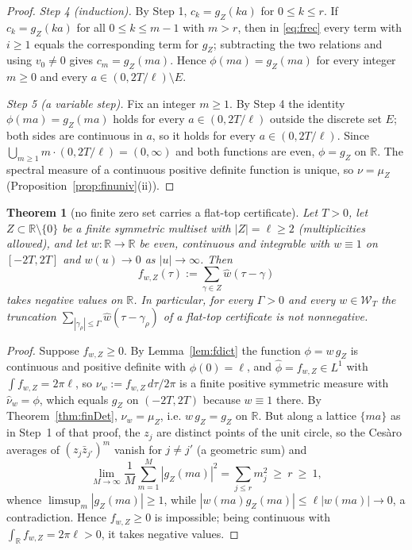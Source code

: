 \documentclass[11pt]{amsart}
\newtheorem{theorem}{Theorem}[section]
\theoremstyle{definition}
\theoremstyle{remark}
\newcommand{\R}{\mathbb R}
\newcommand{\nuh}{\widehat\nu}
\newcommand{\wh}{\widehat w}
\newcommand{\Wcl}{\mathcal W_T}
\begin{document}
\begin{proof}
\emph{Step 4 (induction).} By Step 1, $c_k=g_Z(ka)$ for $0\le k\le r$. If $c_k=g_Z(ka)$ for all
$0\le k\le m-1$ with $m>r$, then in \eqref{eq:frec} every term with $i\ge1$ equals the
corresponding term for $g_Z$; subtracting the two relations and using $v_0\ne0$ gives
$c_m=g_Z(ma)$. Hence $\phi(ma)=g_Z(ma)$ for every integer $m\ge0$ and every
$a\in(0,2T/\ell)\setminus E$.

\emph{Step 5 (a variable step).} Fix an integer $m\ge1$. By Step 4 the identity
$\phi(ma)=g_Z(ma)$ holds for every $a\in(0,2T/\ell)$ outside the discrete set $E$; both sides are
continuous in $a$, so it holds for every $a\in(0,2T/\ell)$. Since
$\bigcup_{m\ge1}m\cdot(0,2T/\ell)=(0,\infty)$ and both functions are even, $\phi=g_Z$ on $\R$. The
spectral measure of a continuous positive definite function is unique, so $\nu=\mu_Z$
(Proposition~\ref{prop:finuniv}(ii)).
\end{proof}

\begin{theorem}[no finite zero set carries a flat-top certificate]\label{thm:finZ}
Let $T>0$, let $Z\subset\R\setminus\{0\}$ be a finite symmetric multiset with $|Z|=\ell\ge2$
(multiplicities allowed), and let $w:\R\to\R$ be even, continuous and integrable with $w\equiv1$ on
$[-2T,2T]$ and $w(u)\to0$ as $|u|\to\infty$. Then
\[
f_{w,Z}(\tau):=\sum_{\gamma\in Z}\wh(\tau-\gamma)
\]
takes negative values on $\R$. In particular, for every $\Gamma>0$ and every $w\in\Wcl$ the
truncation $\sum_{|\gamma_\rho|\le\Gamma}\wh(\tau-\gamma_\rho)$ of a flat-top certificate is
not nonnegative.
\end{theorem}
\begin{proof}
Suppose $f_{w,Z}\ge0$. By Lemma~\ref{lem:fdict} the function $\phi=w\,g_Z$ is continuous and
positive definite with $\phi(0)=\ell$, and $\widehat\phi=f_{w,Z}\in L^1$ with $\int f_{w,Z}=2\pi\ell$, so
$\nu_w:=f_{w,Z}\,d\tau/2\pi$ is a finite positive symmetric measure with $\nuh_w=\phi$, which equals
$g_Z$ on $(-2T,2T)$ because $w\equiv1$ there. By Theorem~\ref{thm:finDet}, $\nu_w=\mu_Z$, i.e.
$w\,g_Z=g_Z$ on $\R$. But along a lattice $\{ma\}$ as in Step~1 of that proof, the $z_j$ are
distinct points of the unit circle, so the Ces\`aro averages of $(z_j\bar z_{j'})^m$ vanish for
$j\ne j'$ (a geometric sum) and
\[
\lim_{M\to\infty}\frac1M\sum_{m=1}^{M}|g_Z(ma)|^2=\sum_{j\le r}m_j^2\ \ge\ r\ \ge\ 1 ,
\]
whence $\limsup_m|g_Z(ma)|\ge1$, while $|w(ma)g_Z(ma)|\le\ell|w(ma)|\to0$, a contradiction. Hence
$f_{w,Z}\ge0$ is impossible; being continuous with $\int_\R f_{w,Z}=2\pi\ell>0$, it takes negative
values.
\end{proof}
\end{document}

